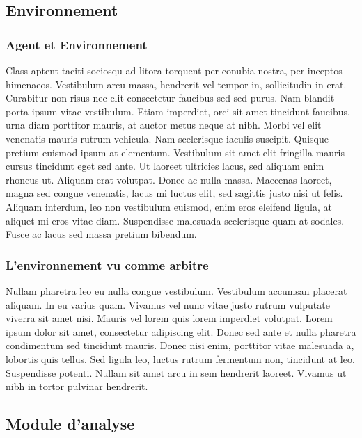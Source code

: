 \subsection{Environnement}

\subsubsection{\og Agent \fg{} et \og Environnement \fg{}  }

Class aptent taciti sociosqu ad litora torquent per conubia nostra, per inceptos himenaeos. Vestibulum arcu massa, hendrerit vel tempor in, sollicitudin in erat. Curabitur non risus nec elit consectetur faucibus sed sed purus. Nam blandit porta ipsum vitae vestibulum. Etiam imperdiet, orci sit amet tincidunt faucibus, urna diam porttitor mauris, at auctor metus neque at nibh. Morbi vel elit venenatis mauris rutrum vehicula. Nam scelerisque iaculis suscipit. Quisque pretium euismod ipsum at elementum. Vestibulum sit amet elit fringilla mauris cursus tincidunt eget sed ante. Ut laoreet ultricies lacus, sed aliquam enim rhoncus ut. Aliquam erat volutpat. Donec ac nulla massa. Maecenas laoreet, magna sed congue venenatis, lacus mi luctus elit, sed sagittis justo nisi ut felis. Aliquam interdum, leo non vestibulum euismod, enim eros eleifend ligula, at aliquet mi eros vitae diam. Suspendisse malesuada scelerisque quam at sodales. Fusce ac lacus sed massa pretium bibendum. 

\subsubsection{L'environnement vu comme \og arbitre \fg{} }

Nullam pharetra leo eu nulla congue vestibulum. Vestibulum accumsan placerat aliquam. In eu varius quam. Vivamus vel nunc vitae justo rutrum vulputate viverra sit amet nisi. Mauris vel lorem quis lorem imperdiet volutpat. Lorem ipsum dolor sit amet, consectetur adipiscing elit. Donec sed ante et nulla pharetra condimentum sed tincidunt mauris. Donec nisi enim, porttitor vitae malesuada a, lobortis quis tellus. Sed ligula leo, luctus rutrum fermentum non, tincidunt at leo. Suspendisse potenti. Nullam sit amet arcu in sem hendrerit laoreet. Vivamus ut nibh in tortor pulvinar hendrerit. 

\subsection{Module d'analyse}


